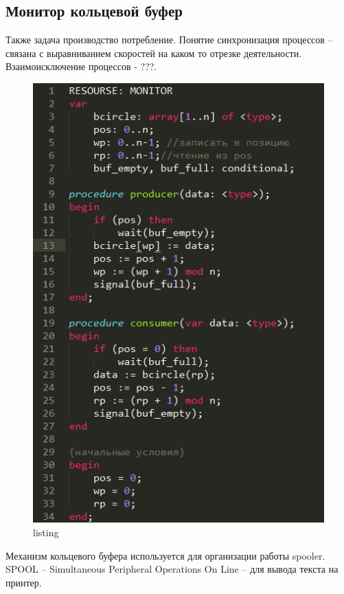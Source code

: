 \subsection{Монитор кольцевой буфер}

Также задача производство потребление.
Понятие синхронизация процессов – связана с выравниванием скоростей на каком то отрезке деятельности. 
Взаимоисключение процессов - ???.

\begin{figure}[H]
    \centering
    \includegraphics{listing/4.png}
    \caption{listing}
\end{figure}

Механизм кольцевого буфера используется для организации работы spooler. SPOOL – Simultaneous Peripheral Operations On Line – для вывода текста на принтер.  

